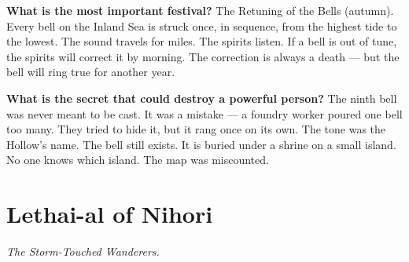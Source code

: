 \begin{almanac}
\textbf{What is the most important festival?} The Retuning of the Bells (autumn). Every bell on the Inland Sea is struck once, in sequence, from the highest tide to the lowest. The sound travels for miles. The spirits listen. If a bell is out of tune, the spirits will correct it by morning. The correction is always a death --- but the bell will ring true for another year.

\textbf{What is the secret that could destroy a powerful person?} The ninth bell was never meant to be cast. It was a mistake --- a foundry worker poured one bell too many. They tried to hide it, but it rang once on its own. The tone was the Hollow's name. The bell still exists. It is buried under a shrine on a small island. No one knows which island. The map was miscounted.
\end{almanac}

\newpage

\newpage

\chapter{Lethai-al of Nihori}
\label{chap:lethai-al}

\emph{The Storm-Touched Wanderers.}

